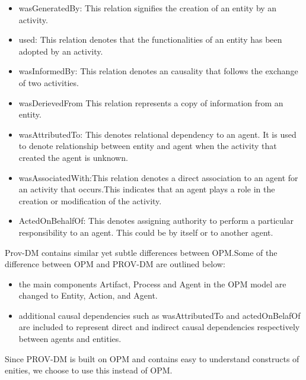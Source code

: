 \begin{itemize}
\item wasGeneratedBy: This relation signifies the creation of an entity by an activity. 

\item used: This relation denotes that the functionalities of an entity has been adopted by an activity.

\item wasInformedBy: This relation denotes an causality that follows the exchange of two activities.

\item wasDerievedFrom This relation represents a copy of information from an entity. 

\item wasAttributedTo: This denotes relational dependency to an agent. It is used to denote relationship between entity and agent when the activity that created the agent is unknown.

\item wasAssociatedWith:This relation denotes a direct association to an agent for an activity that occurs.This indicates that an agent plays a role in the creation or modification of the activity.

\item ActedOnBehalfOf: This denotes assigning authority to perform a particular responsibility to an agent. This could be by itself or to another agent.



\end{itemize}

Prov-DM contains similar yet subtle differences between OPM.Some of the difference between OPM and PROV-DM are outlined below:

\begin{itemize}

\item the main components Artifact, Process and Agent in the OPM model are changed to Entity, Action, and Agent. 

\item additional causal dependencies such as wasAttributedTo and actedOnBelafOf are included to represent direct and indirect causal dependencies respectively between agents and entities.

\end{itemize}

Since PROV-DM is built on OPM and contains easy to understand constructs of enities, we choose to use this instead of OPM. 

